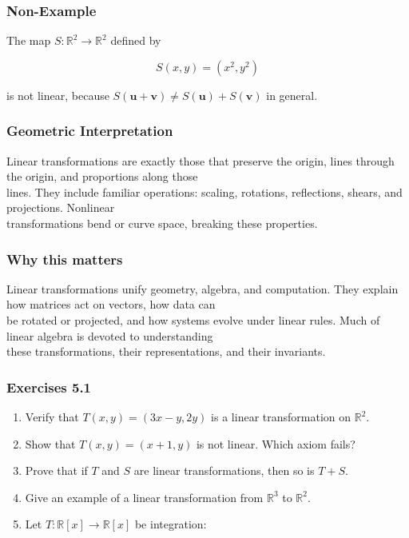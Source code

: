 \documentclass[
  12pt,
  a4paper,
]{article}
\begin{document}
\subsubsection{Non-Example}\label{non-example}

The map \(S:\mathbb{R}^2 \to \mathbb{R}^2\) defined by

\[S(x,y) = (x^2, y^2)\]

is not linear, because
\(S(\mathbf{u} + \mathbf{v}) \neq S(\mathbf{u}) + S(\mathbf{v})\) in
general.

\subsubsection{Geometric
Interpretation}\label{geometric-interpretation-8}

Linear transformations are exactly those that preserve the origin, lines
through the origin, and proportions along those\\
lines. They include familiar operations: scaling, rotations,
reflections, shears, and projections. Nonlinear\\
transformations bend or curve space, breaking these properties.

\subsubsection{Why this matters}\label{why-this-matters-16}

Linear transformations unify geometry, algebra, and computation. They
explain how matrices act on vectors, how data can\\
be rotated or projected, and how systems evolve under linear rules. Much
of linear algebra is devoted to understanding\\
these transformations, their representations, and their invariants.

\subsubsection{Exercises 5.1}\label{exercises-51}

\begin{enumerate}
\def\labelenumi{\arabic{enumi}.}
\item
  Verify that \(T(x,y) = (3x-y, 2y)\) is a linear transformation on
  \(\mathbb{R}^2\).
\item
  Show that \(T(x,y) = (x+1, y)\) is not linear. Which axiom fails?
\item
  Prove that if \(T\) and \(S\) are linear transformations, then so is
  \(T+S\).
\item
  Give an example of a linear transformation from \(\mathbb{R}^3\) to
  \(\mathbb{R}^2\).
\item
  Let \(T:\mathbb{R}[x] \to \mathbb{R}[x]\) be integration:
\end{enumerate}
\end{document}

